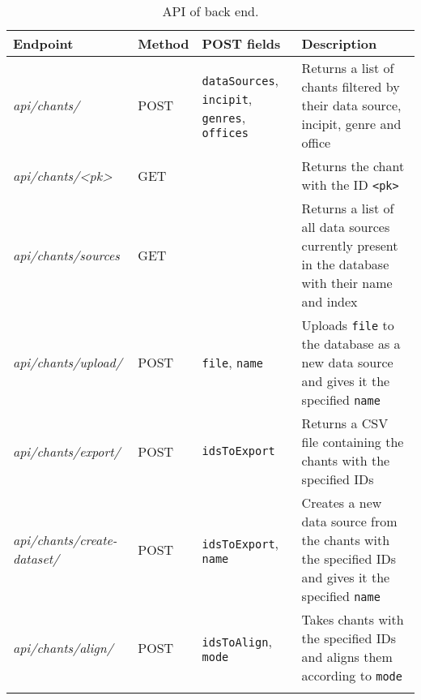 \begin{longtable}{| p{} | p{} | p{} | p{} |} 

 \hline
 Endpoint & Method & POST fields & Description \\
 \hline
\emph{api/chants/}                & POST & \verb|dataSources|, \verb|incipit|, \verb|genres|, \verb|offices| & Returns a list of chants filtered by their data source, incipit, genre and office\\
\emph{api/chants/\textless pk\textgreater} & GET  &                                                          & Returns the chant with the ID \verb|<pk>|\\
\emph{api/chants/sources}         & GET  &                                                                   & Returns a list of all data sources currently present in the database with their name and index\\
\emph{api/chants/upload/}         & POST & \verb|file|, \verb|name|                                          & Uploads \verb|file| to the database as a new data source and gives it the specified \verb|name|\\
\emph{api/chants/export/}         & POST & \verb|idsToExport|                                                & Returns a CSV file containing the chants with the specified IDs\\
\emph{api/chants/create-dataset/} & POST & \verb|idsToExport|, \verb|name|                                   & Creates a new data source from the chants with the specified IDs and gives it the specified \verb|name|\\
\emph{api/chants/align/}          & POST & \verb|idsToAlign|, \verb|mode|                                    & Takes chants with the specified IDs and aligns them according to \verb|mode|\\
 \hline

\caption{API of back end.}
\label{table:api}
\end{longtable}

